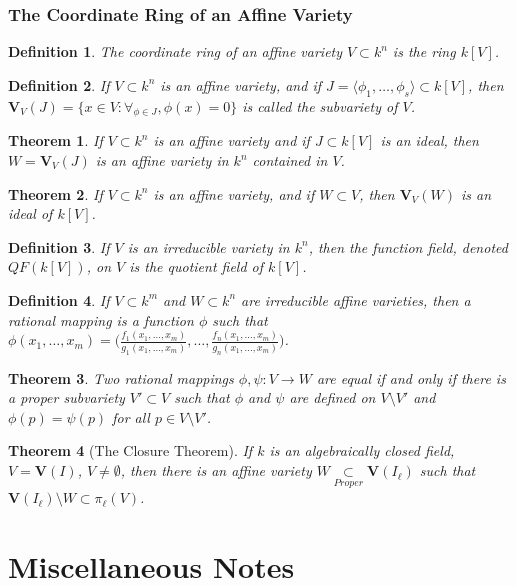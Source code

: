 \documentclass{article}
\theoremstyle{mystyle}
\newtheorem{theorem}{Theorem}[section]
\newtheorem{definition}{Definition}[section]
\begin{document}
\subsubsection{The Coordinate Ring of an Affine Variety}
\begin{definition}
The coordinate ring of an affine variety $V\subset k^n$ is the ring $k[V]$.
\end{definition}
\begin{definition}
If $V\subset k^n$ is an affine variety, and if $J = \langle \phi_1,\hdots, \phi_s\rangle \subset k[V]$, then $\mathbf{V}_{V}(J) = \{x\in V:\forall_{\phi \in J}, \phi(x) = 0 \}$ is called the subvariety of $V$.
\end{definition}
\begin{theorem}
If $V\subset k^n$ is an affine variety and if $J\subset k[V]$ is an ideal, then $W = \mathbf{V}_{V}(J)$ is an affine variety in $k^n$ contained in $V$.
\end{theorem}
\begin{theorem}
If $V\subset k^n$ is an affine variety, and if $W\subset V$, then $\mathbf{V}_{V}(W)$ is an ideal of $k[V]$.
\end{theorem}
\begin{definition}
If $V$ is an irreducible variety in $k^n$, then the function field, denoted $QF(k[V])$, on $V$ is the quotient field of $k[V]$.
\end{definition}
\begin{definition}
If $V\subset k^m$ and $W\subset k^n$ are irreducible affine varieties, then a rational mapping is a function $\phi$ such that $\phi(x_1,\hdots, x_m) = \bigg(\frac{f_1(x_1,\hdots, x_m)}{g_1(x_1,\hdots, x_m)}, \hdots, \frac{f_n(x_1,\hdots, x_m)}{g_n(x_1,\hdots, x_m)}\bigg)$.
\end{definition}
\begin{theorem}
Two rational mappings $\phi,\psi:V\rightarrow W$ are equal if and only if there is a proper subvariety $V'\subset V$ such that $\phi$ and $\psi$ are defined on $V\setminus V'$ and $\phi(p) = \psi(p)$ for all $p \in V\setminus V'$.
\end{theorem}
\begin{theorem}[The Closure Theorem]
If $k$ is an algebraically closed field, $V=\mathbf{V}(I)$, $V\ne \emptyset$, then there is an affine variety $W\underset{Proper}\subset \mathbf{V}(I_{\ell})$ such that $\mathbf{V}(I_{\ell})\setminus W \subset \pi_{\ell}(V)$.
\end{theorem}
\section{Miscellaneous Notes}
\end{document}
